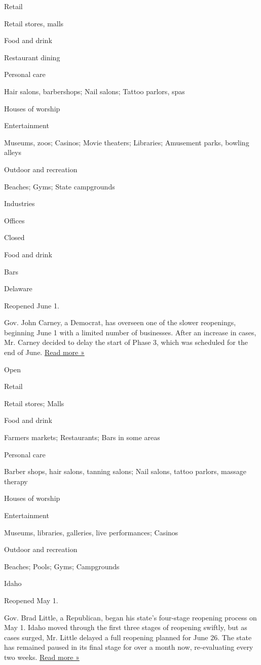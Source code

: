 Retail

Retail stores, malls

Food and drink

Restaurant dining

Personal care

Hair salons, barbershops; Nail salons; Tattoo parlors, spas

Houses of worship

Entertainment

Museums, zoos; Casinos; Movie theaters; Libraries; Amusement parks,
bowling alleys

Outdoor and recreation

Beaches; Gyms; State campgrounds

Industries

Offices

Closed

Food and drink

Bars

Delaware

Reopened June 1.

Gov. John Carney, a Democrat, has overseen one of the slower reopenings,
beginning June 1 with a limited number of businesses. After an increase
in cases, Mr. Carney decided to delay the start of Phase 3, which was
scheduled for the end of June.
\href{https://www.delawareonline.com/story/news/coronavirus-in-delaware/2020/06/25/delaware-wont-go-into-phase-3-monday-gov-john-carney-says-coronavirus-delaware-reopen-covid-19/3260541001/}{Read
more »}

Open

Retail

Retail stores; Malls

Food and drink

Farmers markets; Restaurants; Bars in some areas

Personal care

Barber shops, hair salons, tanning salons; Nail salons, tattoo parlors,
massage therapy

Houses of worship

Entertainment

Museums, libraries, galleries, live performances; Casinos

Outdoor and recreation

Beaches; Pools; Gyms; Campgrounds

Idaho

Reopened May 1.

Gov. Brad Little, a Republican, began his state's four-stage reopening
process on May 1. Idaho moved through the first three stages of
reopening swiftly, but as cases surged, Mr. Little delayed a full
reopening planned for June 26. The state has remained paused in its
final stage for over a month now, re-evaluating every two weeks.
\href{https://idahonews.com/news/coronavirus/gov-little-to-address-idahoans-about-stage-4-again}{Read
more »}

